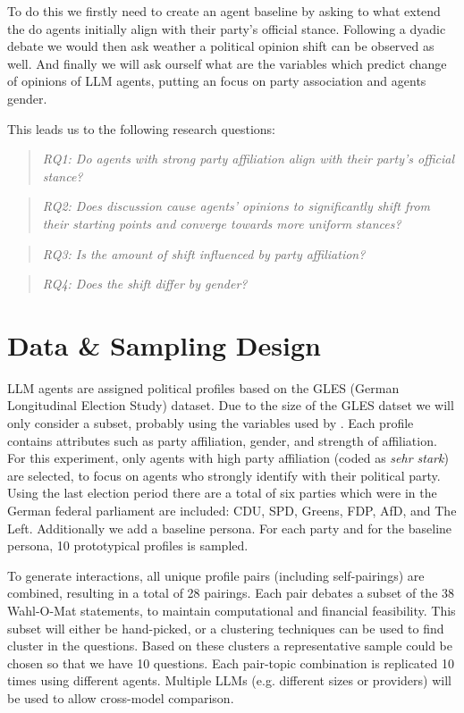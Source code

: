 \documentclass[12pt]{article}
\newcommand{\researchquestion}[1]{\begin{quote}\sloppy \emph{#1} \end{quote}}
\begin{document}
\begin{multicols}{2}
To do this we firstly need to create an agent baseline by asking to what extend the do agents initially align with their party's official stance. Following a dyadic debate we would then ask weather a political opinion shift can be observed as well. And finally we will ask ourself what are the variables which predict change of opinions of LLM agents, putting an focus on party association and agents gender. 

This leads us to the following research questions:
\researchquestion{RQ1: Do agents with strong party affiliation align with their party’s official stance?}
\researchquestion{RQ2: Does discussion cause agents' opinions to significantly shift from their starting points and converge towards more uniform stances?}
\researchquestion{RQ3: Is the amount of shift influenced by party affiliation?}
\researchquestion{RQ4: Does the shift differ by gender?}


\section{Data \& Sampling Design}

LLM agents are assigned political profiles based on the GLES (German Longitudinal Election Study) dataset. Due to the size of the GLES datset we will only consider a subset, probably using the variables used by . Each profile contains attributes such as party affiliation, gender, and strength of affiliation. For this experiment, only agents with high party affiliation (coded as \textit{sehr stark}) are selected, to focus on agents who strongly identify with their political party. Using the last election period there are a total of six parties which were in the German federal parliament are included: CDU, SPD, Greens, FDP, AfD, and The Left. Additionally we add a baseline persona. For each party and for the baseline persona, 10 prototypical profiles is sampled. 

To generate interactions, all unique profile pairs (including self-pairings) are combined, resulting in a total of 28 pairings. Each pair debates a subset of the 38 Wahl-O-Mat statements, to maintain computational and financial feasibility. This subset will either be hand-picked, or a clustering techniques can be used to find cluster in the questions. Based on these clusters a representative sample could be chosen so that we have 10 questions. Each pair-topic combination is replicated 10 times using different agents. Multiple LLMs (e.g. different sizes or providers) will be used to allow cross-model comparison.

\end{multicols}
\end{document}
